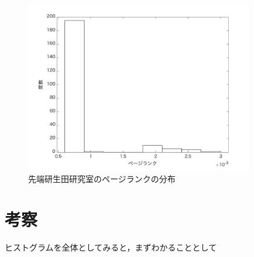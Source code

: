 \documentclass[10pt]{jarticle}
\begin{document}
\begin{figure}[H]
  \begin{center}
  \includegraphics[width=10cm]{../histograms/ia.png}
  \caption{先端研生田研究室のページランクの分布}
  \end{center}
\end{figure}

\section{考察}

ヒストグラムを全体としてみると，まずわかることとして
\end{document}
